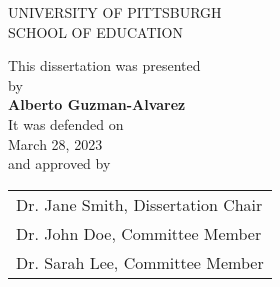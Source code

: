 
\setcounter{page}{2}

\pagestyle{plain}
\begin{spacing}{2}


\begin{center}
UNIVERSITY OF PITTSBURGH\\
SCHOOL OF EDUCATION
\end{center}

\vfill

\begin{center}
This dissertation was presented\\
by\\
\vspace{.5cm}
\textbf{Alberto Guzman-Alvarez}\\
\vspace{.5cm}
It was defended on\\
March 28, 2023\\
and approved by
\end{center}

\begin{center}
\begin{tabular}{l}
Dr. Jane Smith, Dissertation Chair \\
Dr. John Doe, Committee Member \\
Dr. Sarah Lee, Committee Member
\end{tabular}
\end{center}

\vfill

    \end{spacing}        

\newpage
